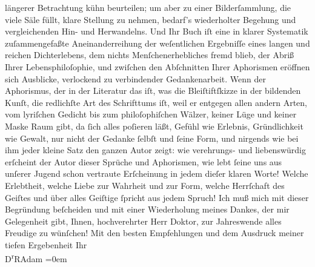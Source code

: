 \begin{ledgroupsized}[t]{13cm}
                    längerer Betrachtung {\pb}kühn
                    beurteilen; um aber zu einer Bilderſammlung, die viele Säle füllt, klare
                    Stellung zu nehmen, bedarf’s wiederholter Begehung und vergleichenden Hin- und
                    Herwandelns. Und Ihr Buch iſt eine in klarer Systematik zuſammengefaßte
                    Aneinanderreihung der weſentlichen Ergebniſſe eines langen und reichen
                    Dichterlebens, dem nichts Menſchenerhebliches fremd blieb, der Abriß Ihrer
                    Lebensphiloſophie, und zwiſchen den Abſchnitten Ihrer Aphorismen eröffnen sich
                    Ausblicke, verlockend zu verbindender Gedankenarbeit. Wenn der Aphorismus, der
                    in der Literatur das iſt, was die Bleiſtiftſkizze in der bildenden Kunſt, die
                    redlichſte Art des Schrifttums iſt, weil er entgegen allen andern Arten, vom
                    lyriſchen Gedicht bis zum philoſophiſchen Wälzer, keiner Lüge und keiner Maske
                    Raum  gibt, {\pb}da ſich alles poſieren läßt, Gefühl
                    wie Erlebnis, Gründlichkeit wie Gewalt, nur nicht der Gedanke ſelbſt und ſeine
                    Form, und nirgends wie bei ihm jeder kleine Satz den ganzen Autor zeigt: wie
                    verehrungs- und liebenswürdig erſcheint der Autor dieser Sprüche und Aphorismen,
                    wie lebt ſeine uns aus unſerer Jugend schon vertraute Erſcheinung in jedem
                    dieſer klaren Worte! Welche Erlebtheit, welche Liebe zur Wahrheit und zur Form,
                    welche Herrſchaft des Geiſtes und über alles Geiſtige ſpricht aus jedem
                    Spruch!\pend
           \pstart
           Ich muß mich mit dieser Begründung beſcheiden und mit einer Wiederholung meines
                    Dankes, der mir Gelegenheit gibt, Ihnen, hochverehrter Herr Doktor, zur
                    Jahreswende alles Freudige zu wünſchen!\pend
           \pstart
           Mit den besten Empfehlungen und {\pb}dem
                    Ausdruck meiner tiefen Ergebenheit\pend
           \pstart
           Ihr{\\[\baselineskip]}\spacefill\mbox{D\textsuperscript{r}RAdam}\pend
           \leftskip=0em{}\endnumbering{}\end{ledgroupsized}  \newcommand{\dateiname}{L02497}\newcommand{\titel}{Robert Adam an Arthur Schnitzler, 30. 12. 1927}\newcommand{\editorInnen}{Martin Anton Müller und Gerd-Hermann Susen}
      